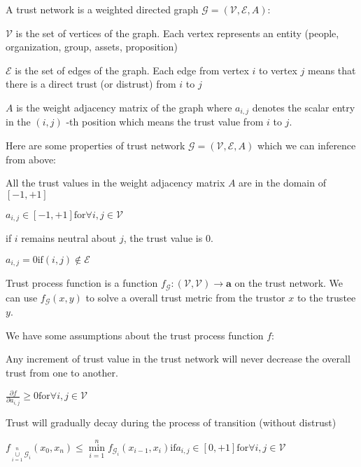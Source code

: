 \documentclass{article}
\begin{document}

A trust network is a weighted directed graph \(\mathcal{G}=(\mathcal{V},\mathcal{E},A)\):


\item \(\mathcal{V}\) is the set of vertices of the graph. Each vertex represents an entity (people, organization, group, assets, proposition)


\item \(\mathcal{E}\) is the set of edges of the graph. Each edge from vertex \(i\) to vertex \(j\) means that there is a direct trust (or distrust)
from \(i\) to \(j\)


\item \(A\) is the weight adjacency matrix of the graph where \(a_{i,j}\) denotes the scalar entry in the \((i,j)\) -th position which means the
trust value from \(i\) to \(j\).



Here are some properties of trust network \(\mathcal{G}=(\mathcal{V},\mathcal{E},A)\) which we can inference from above:

All the trust values in the weight adjacency matrix \(A\) are in the domain of \([-1,+1]\)

\(a_{i,j}\in [-1,+1] \text{for} \forall i,j\in \mathcal{V}\)

if \(i\) remains neutral about \(j\), the trust value is \(0\).

\(a_{i,j}=0 \text{if} (i,j)\notin \mathcal{E}\)



Trust process function is a function \(f_{\mathcal{G}}:(\mathcal{V},\mathcal{V})\to \mathbf{a}\) on the trust network. We can use \(f_{\mathcal{G}}(x,y)\)
to solve a overall trust metric from the trustor \(x\) to the trustee \(y\).



We have some assumptions about the trust process function \(f\):

Any increment of trust value in the trust network will never decrease the overall trust from one to another.

\(\frac{\partial f}{\partial a_{i,j}}\geqslant 0 \text{for} \forall i,j\in \mathcal{V}\)

Trust will gradually decay during the process of transition (without distrust)

\(f_{\underset{i=1}{\overset{n}{\cup }}\mathcal{G}_i}\left(x_0,x_n\right)\leq \underset{i=1}{\overset{n}{\min }}f_{\mathcal{G}_i}\left(x_{i-1},x_i\right)
\text{if} a_{i,j}\in [0,+1] \text{for} \forall i,j\in \mathcal{V}\)
\end{document}
